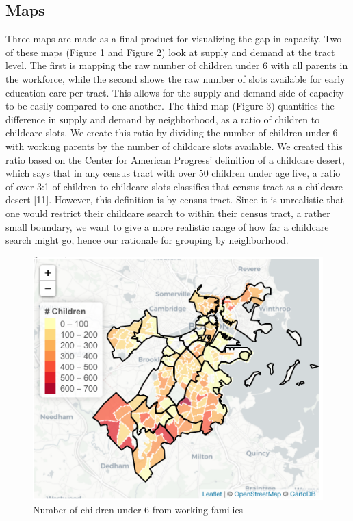 \documentclass[10pt,letterpaper]{article}
\begin{document}
\subsection{Maps}\label{maps}

Three maps are made as a final product for visualizing the gap in
capacity. Two of these maps (Figure 1 and Figure 2) look at supply and
demand at the tract level. The first is mapping the raw number of
children under 6 with all parents in the workforce, while the second
shows the raw number of slots available for early education care per
tract. This allows for the supply and demand side of capacity to be
easily compared to one another. The third map (Figure 3) quantifies the
difference in supply and demand by neighborhood, as a ratio of children
to childcare slots. We create this ratio by dividing the number of
children under 6 with working parents by the number of childcare slots
available. We created this ratio based on the Center for American
Progress' definition of a childcare desert, which says that in any
census tract with over 50 children under age five, a ratio of over 3:1
of children to childcare slots classifies that census tract as a
childcare desert {[}11{]}. However, this definition is by census tract.
Since it is unrealistic that one would restrict their childcare search
to within their census tract, a rather small boundary, we want to give a
more realistic range of how far a childcare search might go, hence our
rationale for grouping by neighborhood.

\begin{figure}

{\centering \includegraphics[width=1\linewidth]{fig1_capacitytractdemand} 

}

\caption{Number of children under 6 from working families}\label{fig:unnamed-chunk-1}
\end{figure}
\end{document}
